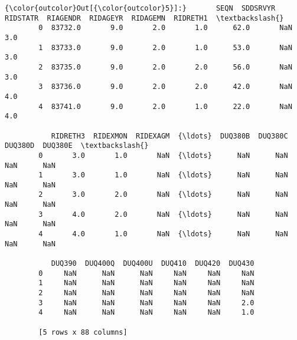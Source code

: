\documentclass[11pt]{article}
\begin{document}
\begin{Verbatim}[commandchars=\\\{\}]
{\color{outcolor}Out[{\color{outcolor}5}]:}       SEQN  SDDSRVYR  RIDSTATR  RIAGENDR  RIDAGEYR  RIDAGEMN  RIDRETH1  \textbackslash{}
        0  83732.0       9.0       2.0       1.0      62.0       NaN       3.0   
        1  83733.0       9.0       2.0       1.0      53.0       NaN       3.0   
        2  83735.0       9.0       2.0       2.0      56.0       NaN       3.0   
        3  83736.0       9.0       2.0       2.0      42.0       NaN       4.0   
        4  83741.0       9.0       2.0       1.0      22.0       NaN       4.0   
        
           RIDRETH3  RIDEXMON  RIDEXAGM  {\ldots}  DUQ380B  DUQ380C  DUQ380D  DUQ380E  \textbackslash{}
        0       3.0       1.0       NaN  {\ldots}      NaN      NaN      NaN      NaN   
        1       3.0       1.0       NaN  {\ldots}      NaN      NaN      NaN      NaN   
        2       3.0       2.0       NaN  {\ldots}      NaN      NaN      NaN      NaN   
        3       4.0       2.0       NaN  {\ldots}      NaN      NaN      NaN      NaN   
        4       4.0       1.0       NaN  {\ldots}      NaN      NaN      NaN      NaN   
        
           DUQ390  DUQ400Q  DUQ400U  DUQ410  DUQ420  DUQ430  
        0     NaN      NaN      NaN     NaN     NaN     NaN  
        1     NaN      NaN      NaN     NaN     NaN     NaN  
        2     NaN      NaN      NaN     NaN     NaN     NaN  
        3     NaN      NaN      NaN     NaN     NaN     2.0  
        4     NaN      NaN      NaN     NaN     NaN     1.0  
        
        [5 rows x 88 columns]
\end{Verbatim}
            
\end{document}
